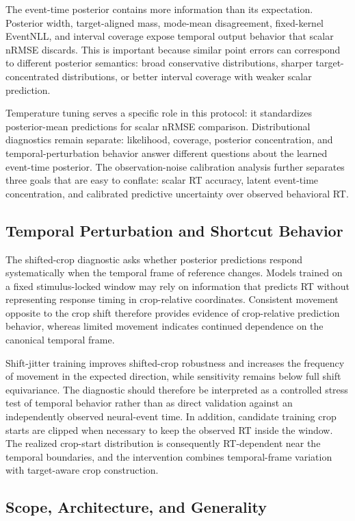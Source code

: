 \documentclass[12pt]{article}
\begin{document}
The event-time posterior contains more information than its expectation. Posterior width, target-aligned mass, mode-mean disagreement, fixed-kernel EventNLL, and interval coverage expose temporal output behavior that scalar nRMSE discards. This is important because similar point errors can correspond to different posterior semantics: broad conservative distributions, sharper target-concentrated distributions, or better interval coverage with weaker scalar prediction.

Temperature tuning serves a specific role in this protocol: it standardizes posterior-mean predictions for scalar nRMSE comparison. Distributional diagnostics remain separate: likelihood, coverage, posterior concentration, and temporal-perturbation behavior answer different questions about the learned event-time posterior. The observation-noise calibration analysis further separates three goals that are easy to conflate: scalar RT accuracy, latent event-time concentration, and calibrated predictive uncertainty over observed behavioral RT.

\subsection{Temporal Perturbation and Shortcut Behavior}

The shifted-crop diagnostic asks whether posterior predictions respond systematically when the temporal frame of reference changes. Models trained on a fixed stimulus-locked window may rely on information that predicts RT without representing response timing in crop-relative coordinates. Consistent movement opposite to the crop shift therefore provides evidence of crop-relative prediction behavior, whereas limited movement indicates continued dependence on the canonical temporal frame.

Shift-jitter training improves shifted-crop robustness and increases the frequency of movement in the expected direction, while sensitivity remains below full shift equivariance. The diagnostic should therefore be interpreted as a controlled stress test of temporal behavior rather than as direct validation against an independently observed neural-event time. In addition, candidate training crop starts are clipped when necessary to keep the observed RT inside the window. The realized crop-start distribution is consequently RT-dependent near the temporal boundaries, and the intervention combines temporal-frame variation with target-aware crop construction.

\subsection{Scope, Architecture, and Generality}
\end{document}
